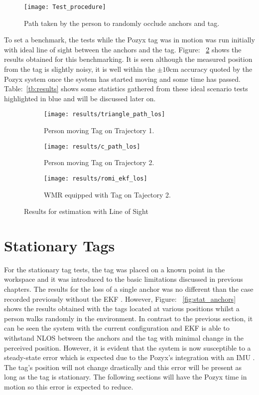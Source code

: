 \begin{figure}[ht!]
    \centering
    \texttt{[image: Test\_procedure]}
    \caption{Path taken by the person to randomly occlude anchors and tag.}
    \label{fig:occlude}
\end{figure}
To set a benchmark, the tests while the Pozyx tag was in motion was run initially with ideal line of sight between the anchors and the tag.
Figure: ~\ref{fig:los} shows the results obtained for this benchmarking.
It is seen although the measured position from the tag is slightly noisy, it is well within the $\pm10$cm accuracy quoted by the Pozyx system once the system has started moving and some time has passed.
Table:~\ref{tb:results} shows some statistics gathered from these ideal scenario tests highlighted in blue and will be discussed later on.

\begin{figure}[h!]
    \centering
    \begin{subfigure}{0.49\textwidth}
            \texttt{[image: results/triangle\_path\_los]}
            \caption{Person moving Tag on Trajectory 1.}
    \end{subfigure}
    \begin{subfigure}{0.49\textwidth}
            \texttt{[image: results/c\_path\_los]}
            \caption{Person moving Tag on Trajectory 2.}
    \end{subfigure}
    \begin{subfigure}{0.5\textwidth}
            \texttt{[image: results/romi\_ekf\_los]}
            \caption{WMR equipped with Tag on Tajectory 2.}
    \end{subfigure}
    \caption{Results for estimation with Line of Sight}
    \label{fig:los}
\end{figure}
\newpage
\section{Stationary Tags}\label{sec:stationary-tags}
For the stationary tag tests, the tag was placed on a known point in the workspace and it was introduced to the basic limitations discussed in previous chapters.
The results for the loss of a single anchor was no different than the case recorded previously without the EKF .
However, Figure: ~\ref{fig:stat_anchors} shows the results obtained with the tags located at various positions whilst a person walks randomly in the environment.
In contrast to the previous section, it can be seen the system with the current configuration and EKF is able to withstand NLOS between the anchors and the tag with minimal change in the perceived position.
However, it is evident that the system is now susceptible to a steady-state error which is expected due to the Pozyx's integration with an IMU .
The tag's position will not change drastically and this error will be present as long as the tag is stationary.
The following sections will have the Pozyx time in motion so this error is expected to reduce.

